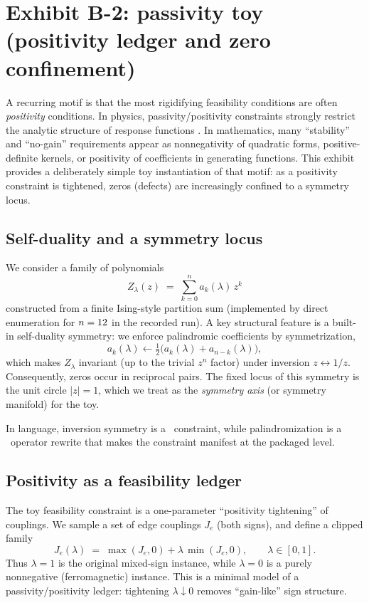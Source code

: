 \section{Exhibit B-2: passivity toy (positivity ledger and zero confinement)}
\label{sec:exhibit-passivity}

A recurring \SBT motif is that the most rigidifying feasibility conditions are often \emph{positivity} conditions.
In physics, passivity/positivity constraints strongly restrict the analytic structure of response functions \cite{Willems1972II}.
In mathematics, many ``stability'' and ``no-gain'' requirements appear as nonnegativity of quadratic forms, positive-definite kernels, or positivity of coefficients in generating functions.
This exhibit provides a deliberately simple toy instantiation of that motif:
as a positivity constraint is tightened, zeros (defects) are increasingly confined to a symmetry locus.

\subsection{Self-duality and a symmetry locus}
We consider a family of polynomials
\[
Z_\lambda(z) \;=\; \sum_{k=0}^{n} a_k(\lambda)\,z^k
\]
constructed from a finite Ising-style partition sum (implemented by direct enumeration for $n=12$ in the recorded run).
A key structural feature is a built-in self-duality symmetry:
we enforce palindromic coefficients by symmetrization,
\[
a_k(\lambda)\leftarrow \tfrac12\bigl(a_k(\lambda)+a_{n-k}(\lambda)\bigr),
\]
which makes $Z_\lambda$ invariant (up to the trivial $z^n$ factor) under inversion $z\leftrightarrow 1/z$.
Consequently, zeros occur in reciprocal pairs.
The fixed locus of this symmetry is the unit circle $|z|=1$, which we treat as the \emph{symmetry axis} (or symmetry manifold) for the toy.

In \SBT language, inversion symmetry is a \Ptwo\ constraint, while palindromization is a \Pone\ operator rewrite that makes the constraint manifest at the packaged level.

\subsection{Positivity as a feasibility ledger}
The toy feasibility constraint is a one-parameter ``positivity tightening'' of couplings.
We sample a set of edge couplings $J_e$ (both signs), and define a clipped family
\[
J_e(\lambda) \;=\; \max(J_e,0) + \lambda\,\min(J_e,0),
\qquad \lambda\in[0,1].
\]
Thus $\lambda=1$ is the original mixed-sign instance, while $\lambda=0$ is a purely nonnegative (ferromagnetic) instance.
This is a minimal model of a passivity/positivity ledger: tightening $\lambda\downarrow 0$ removes ``gain-like'' sign structure.


